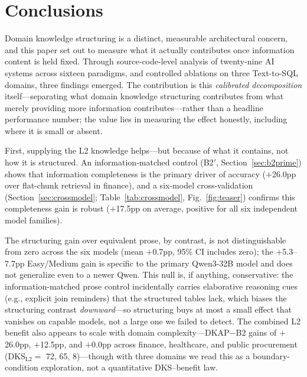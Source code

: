 \documentclass[fleqn,10pt,lineno]{wlpeerj}
\begin{document}
\section{Conclusions}

Domain knowledge structuring is a distinct, measurable architectural concern, and this paper set out to measure what it actually contributes once information content is held fixed. Through source-code-level analysis of twenty-nine AI systems across sixteen paradigms, and controlled ablations on three Text-to-SQL domains, three findings emerged. The contribution is this \textit{calibrated decomposition} itself---separating what domain knowledge structuring contributes from what merely providing more information contributes---rather than a headline performance number; the value lies in measuring the effect honestly, including where it is small or absent.

First, supplying the L2 knowledge helps---but because of what it contains, not how it is structured. An information-matched control (B2$'$, Section~\ref{sec:b2prime}) shows that information completeness is the primary driver of accuracy ($+$26.0pp over flat-chunk retrieval in finance), and a six-model cross-validation (Section~\ref{sec:crossmodel}; Table~\ref{tab:crossmodel}, Fig.~\ref{fig:teaser}) confirms this completeness gain is robust ($+$17.5pp on average, positive for all six independent model families).

The structuring gain over equivalent prose, by contrast, is not distinguishable from zero across the six models (mean $+$0.7pp, 95\% CI includes zero); the $+$5.3--7.7pp Easy/Medium gain is specific to the primary Qwen3-32B model and does not generalize even to a newer Qwen. This null is, if anything, conservative: the information-matched prose control incidentally carries elaborative reasoning cues (e.g., explicit join reminders) that the structured tables lack, which biases the structuring contrast \textit{downward}---so structuring buys at most a small effect that vanishes on capable models, not a large one we failed to detect. The combined L2 benefit also appears to scale with domain complexity---DKAP$-$B2 gains of $+$26.0pp, $+$12.5pp, and $+$0.0pp across finance, healthcare, and public procurement ($\mathrm{DKS}_{\mathrm{L2}} =$ 72, 65, 8)---though with three domains we read this as a boundary-condition exploration, not a quantitative DKS--benefit law.
\end{document}
